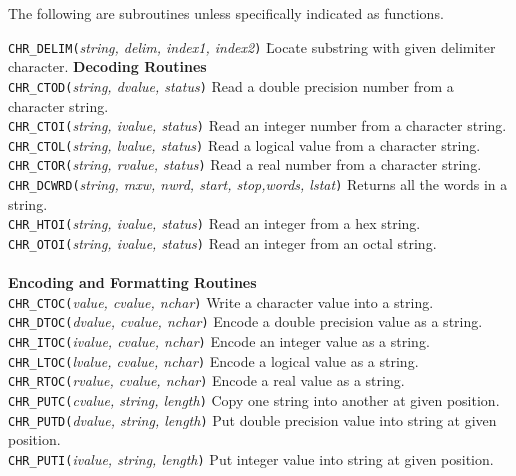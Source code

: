 The following are subroutines unless specifically indicated as functions.
\begin{tabbing}
 {{\tt{CHR\_DELIM(}}{\em string, delim, index1, index2}{\tt )}} \=
 Locate substring with given delimiter character.\kill
{\bf Decoding Routines}\\
 {{\tt{CHR\_CTOD(}}{\em string, dvalue, status}{\tt )}}  \>
 Read a double precision number from a character string.\\
 {{\tt{CHR\_CTOI(}}{\em string, ivalue, status}{\tt )}}\>
 Read an integer number from a character string.\\
 {{\tt{CHR\_CTOL(}}{\em string, lvalue, status}{\tt )}}\>
 Read a logical value from a character string.\\
 {{\tt{CHR\_CTOR(}}{\em string, rvalue, status}{\tt )}}\>
 Read a real number from a character string.\\
 {{\tt{CHR\_DCWRD(}}{\em string, mxw, nwrd, start, stop,words, lstat}{\tt )}}
 Returns all the words in a string.\\
 {{\tt{CHR\_HTOI(}}{\em string, ivalue, status}{\tt )}}\>
 Read an integer from a hex string.\\
 {{\tt{CHR\_OTOI(}}{\em string, ivalue, status}{\tt )}}\>
 Read an integer from an octal string.\\
\\
{\bf Encoding and Formatting Routines}\\
 {{\tt{CHR\_CTOC(}}{\em value, cvalue, nchar}{\tt )}}\>
 Write a character value into a string.\\
 {{\tt{CHR\_DTOC(}}{\em dvalue, cvalue, nchar}{\tt )}}\>
 Encode a double precision value as a string.\\
 {{\tt{CHR\_ITOC(}}{\em ivalue, cvalue, nchar}{\tt )}}\>
 Encode an integer value as a string.\\
 {{\tt{CHR\_LTOC(}}{\em lvalue, cvalue, nchar}{\tt )}}\>
 Encode a logical value as a string.\\
 {{\tt{CHR\_RTOC(}}{\em rvalue, cvalue, nchar}{\tt )}}\>
 Encode a real value as a string.\\
 {{\tt{CHR\_PUTC(}}{\em cvalue, string, length}{\tt )}}\>
 Copy one string into another at given position.\\
 {{\tt{CHR\_PUTD(}}{\em dvalue, string, length}{\tt )}}\>
 Put double precision value into string at given position.\\
 {{\tt{CHR\_PUTI(}}{\em ivalue, string, length}{\tt )}}\>
 Put integer value into string at given position.\\

\end{tabbing}
